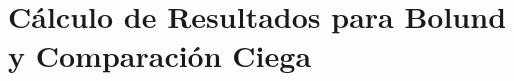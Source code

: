 \graphicspath{{./Imagenes/an1/}}
\chapter{Cálculo de Resultados para Bolund y Comparación Ciega}
\label{ch:apA}
%
%
%
%
%
%
